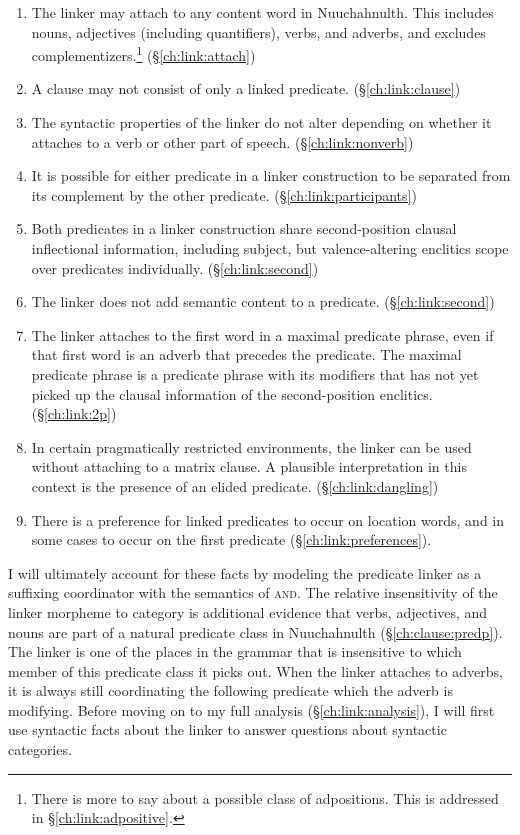 \begin{enumerate}[nolistsep]
	\item The linker may attach to any content word in Nuuchahnulth. This includes nouns, adjectives (including quantifiers), verbs, and adverbs, and excludes complementizers.\footnote{There is more to say about a possible class of adpositions. This is addressed in \S\ref{ch:link:adpositive}.} (\S\ref{ch:link:attach})
	\item A clause may not consist of only a linked predicate. (\S\ref{ch:link:clause})
	\item The syntactic properties of the linker do not alter depending on whether it attaches to a verb or other part of speech. (\S\ref{ch:link:nonverb})
	\item It is possible for either predicate in a linker construction to be separated from its complement by the other predicate. (\S\ref{ch:link:participants})
	\item Both predicates in a linker construction share second-position clausal inflectional information, including subject, but valence-altering enclitics scope over predicates individually. (\S\ref{ch:link:second})
	\item The linker does not add semantic content to a predicate. (\S\ref{ch:link:second})
	\item The linker attaches to the first word in a maximal predicate phrase, even if that first word is an adverb that precedes the predicate. The maximal predicate phrase is a predicate phrase with its modifiers that has not yet picked up the clausal information of the second-position enclitics. (\S\ref{ch:link:2p})
	\item In certain pragmatically restricted environments, the linker can be used without attaching to a matrix clause. A plausible interpretation in this context is the presence of an elided predicate. (\S\ref{ch:link:dangling})
	\item There is a preference for linked predicates to occur on location words, and in some cases to occur on the first predicate (\S\ref{ch:link:preferences}).
\end{enumerate}

I will ultimately account for these facts by modeling the predicate linker as a suffixing coordinator with the semantics of \textsc{and}. The relative insensitivity of the linker morpheme to category is additional evidence that verbs, adjectives, and nouns are part of a natural predicate class in Nuuchahnulth (\S\ref{ch:clause:predp}). The linker is one of the places in the grammar that is insensitive to which member of this predicate class it picks out. When the linker attaches to adverbs, it is always still coordinating the following predicate which the adverb is modifying. Before moving on to my full analysis (\S\ref{ch:link:analysis}), I will first use syntactic facts about the linker to answer questions about syntactic categories.

